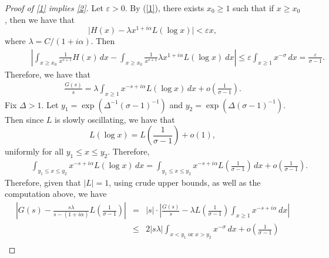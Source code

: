 \documentclass[11pt]{amsart}
\theoremstyle{definition}
\newcommand{\NN}{{\mathcal N}}
\newcommand{\e}{\epsilon}
\begin{document}
\begin{proof}[Proof of \eqref{1} implies \eqref{2}]
Let $\varepsilon>0$. By (\ref{1}), there exists $x_{0}\geq 1$ such that if $x \geq x_{0}$, then we have that 
 $$\vert H(x)-\lambda x^{1+i\alpha}L(\log x)\vert<\varepsilon x,$$
 where $\lambda=C/(1+i\alpha)$. Then
     \begin{equation}\nonumber
    \begin{split}
    &\qquad \left| \int_{x \geq x_{0}}\frac{1}{x^{s+1}}H(x)\,dx-\int_{x\geq x_{0}}\frac{1}{x^{s+1}}\lambda x^{1+i\alpha}L(\log x) \ dx\right|
   \leq %
    \varepsilon\int_{x\geq 1} x^{-\sigma}\,dx = \frac{\varepsilon}{\sigma-1}.
    \end{split}
 \end{equation} 
  Therefore, we have that 
  \begin{equation}\nonumber
    \begin{split}
    \frac{G(s)}{s}=\lambda \int_{x\geq 1} x^{-s+i\alpha}L(\log  x)\,dx+o\left(\frac{1}{\sigma-1}\right).
    \end{split}
 \end{equation}
 Fix $\Delta>1$. Let $y_{1}=\exp(\Delta^{-1}(\sigma-1)^{-1})$ and  $y_{2}=\exp(\Delta(\sigma-1)^{-1})$. Then since $L$ is slowly oscillating, we have that
 $$L(\log  x)=L\left(\frac{1}{\sigma-1}\right)+o(1),$$
 uniformly for all $y_{1}\leq  x\leq y_{2}$. Therefore, 
   \begin{equation}\nonumber
    \begin{split}
   &\qquad \int_{y_{1}\leq x\leq y_{2}}x^{-s+i\alpha}L(\log x)\,dx
   =\int_{ y_{1}\leq x\leq y_{2}}x^{-s+i\alpha}L\left(\frac{1}{\sigma-1}\right)\,dx+o\left(\frac{1}{\sigma-1}\right).
    \end{split}
 \end{equation}
Therefore, given that $|L|=1$, using crude upper bounds, as well as the computation above, we have
  \begin{eqnarray*}
      \left|G(s)-\frac{s\lambda}{s-(1+i\alpha)} L\left(\frac{1}{\sigma-1}\right) \right|
   & = & \vert s\vert\cdot\left|\frac{G(s)}{s}-\lambda L\left(\frac{1}{\sigma-1}\right) \int_{x\geq 1}x^{-s+i\alpha}\,dx\right|
   \\ &\leq & 2\vert s\lambda\vert\int_{x<y_{1} \text{ or } x>y_{2}} x^{-\sigma}\,dx+o\left(\frac{1}{\sigma-1}\right)\\

\end{eqnarray*}
\end{proof}
\end{document}
